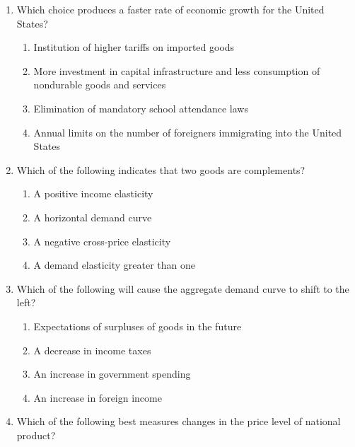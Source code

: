 \documentclass[12pt]{article}
\begin{document}
\begin{enumerate}[label=\arabic*.]
\begin{enumerate}[label=(\alph*)]
    \item assumes that consumers and businesses anticipate rising prices when the government pursues an expansionary fiscal policy.
    \item implies that fiscal policy will be effective even during stagflation.
    \item supports the notion of a Phillips tradeoff.
    \item assumes that consumers and businesses do not use all the information available to them.
\end{enumerate}
\item Which choice produces a faster rate of economic growth for the United States?
\begin{enumerate}[label=(\alph*)]
    \item Institution of higher tariffs on imported goods
    \item More investment in capital infrastructure and less consumption of nondurable goods and services
    \item Elimination of mandatory school attendance laws
    \item Annual limits on the number of foreigners immigrating into the United States
\end{enumerate}
\item Which of the following indicates that two goods are complements?
\begin{enumerate}[label=(\alph*)]
    \item A positive income elasticity
    \item A horizontal demand curve
    \item A negative cross-price elasticity
    \item A demand elasticity greater than one
\end{enumerate}
\item Which of the following will cause the aggregate demand curve to shift to the left?
\begin{enumerate}[label=(\alph*)]
    \item Expectations of surpluses of goods in the future
    \item A decrease in income taxes
    \item An increase in government spending
    \item An increase in foreign income
\end{enumerate}
\item Which of the following best measures changes in the price level of national product?

\end{enumerate}
\end{document}
